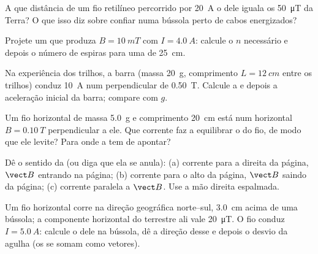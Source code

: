 \begin{exercise}[$\star\star$]\label{exo:g11:magnetic-fields:7}
A que distância de um fio retilíneo percorrido por \qty{20}{A} o 
dele iguala os \qty{50}{\micro T} da Terra? O que isso diz sobre confiar
numa bússola perto de cabos energizados?
\end{exercise}

\begin{exercise}[$\star\star$]\label{exo:g11:magnetic-fields:8}
Projete um  que produza $B = \qty{10}{mT}$ com
$I = \qty{4.0}{A}$: calcule o $n$ necessário e depois o número de espiras
para uma  de \qty{25}{cm}.
\end{exercise}

\begin{exercise}[$\star\star$]\label{exo:g11:magnetic-fields:9}
Na experiência dos trilhos, a barra (massa \qty{20}{g}, comprimento
$L = \qty{12}{cm}$ entre os trilhos) conduz \qty{10}{A} num 
perpendicular de \qty{0.50}{T}. Calcule a  e depois a
aceleração inicial da barra; compare com $g$.
\end{exercise}

\begin{exercise}[$\star\star$]\label{exo:g11:magnetic-fields:10}
Um fio horizontal de massa \qty{5.0}{g} e comprimento \qty{20}{cm} está
num  horizontal $B = \qty{0.10}{T}$ perpendicular a ele. Que
corrente faz a  equilibrar o  do fio, de modo que ele
levite? Para onde a  tem de apontar?
\end{exercise}

\begin{exercise}[$\star\star$]\label{exo:g11:magnetic-fields:11}
Dê o sentido da  (ou diga que ela se anula): (a) corrente
para a direita da página, $\vect B$ entrando na página; (b) corrente para
o alto da página, $\vect B$ saindo da página; (c) corrente paralela a
$\vect B$. Use a mão direita espalmada.
\end{exercise}

\begin{exercise}[$\star\star\star$]\label{exo:g11:magnetic-fields:12}
Um fio horizontal corre na direção geográfica norte--sul, \qty{3.0}{cm}
acima de uma bússola; a componente horizontal do  terrestre ali vale
\qty{20}{\micro T}. O fio conduz $I = \qty{5.0}{A}$: calcule o  dele
na bússola, dê a direção desse  e depois o desvio da agulha (os
 se somam como vetores).
\end{exercise}

